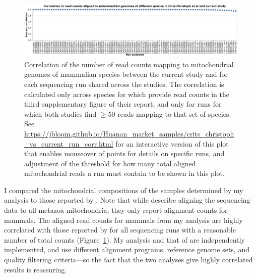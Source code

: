 \documentclass[9pt,twocolumn,twoside]{gsajnl_modified}
\begin{document}
\begin{figure}
\includegraphics[width=\linewidth]{figures/crits_christoph_vs_current_run_corr.pdf}
\caption{
Correlation of the number of read counts mapping to mitochondrial genomes of mammalian species between the current study and \citet{crits2023genetic} for each sequencing run shared across the studies.
The correlation is calculated only across species for which \citet{crits2023genetic} provide read counts in the third supplementary figure of their report, and only for runs for which both studies find $\ge$50 reads mapping to that set of species.
See \url{https://jbloom.github.io/Huanan_market_samples/crits_christoph_vs_current_run_corr.html} for an interactive version of this plot that enables mouseover of points for details on specific runs, and adjustment of the threshold for how many total aligned mitochondrial reads a run must contain to be shown in this plot.
\label{fig:crits_christoph_vs_current_run_corr}
}
\end{figure}

I compared the mitochondrial compositions of the samples determined by my analysis to those reported by \citet{crits2023genetic}.
Note that while \citet{crits2023genetic} describe aligning the sequencing data to all metazoa mitochondria, they only report alignment counts for mammals.
The aligned read counts for mammals from my analysis are highly correlated with those reported by \citet{crits2023genetic} for all sequencing runs with a reasonable number of total counts (Figure~\ref{fig:crits_christoph_vs_current_run_corr}).
My analysis and that of \citet{crits2023genetic} are independently implemented, and use different alignment programs, reference genome sets, and quality filtering criteria---so the fact that the two analyses give highly correlated results is reassuring.
\end{document}
